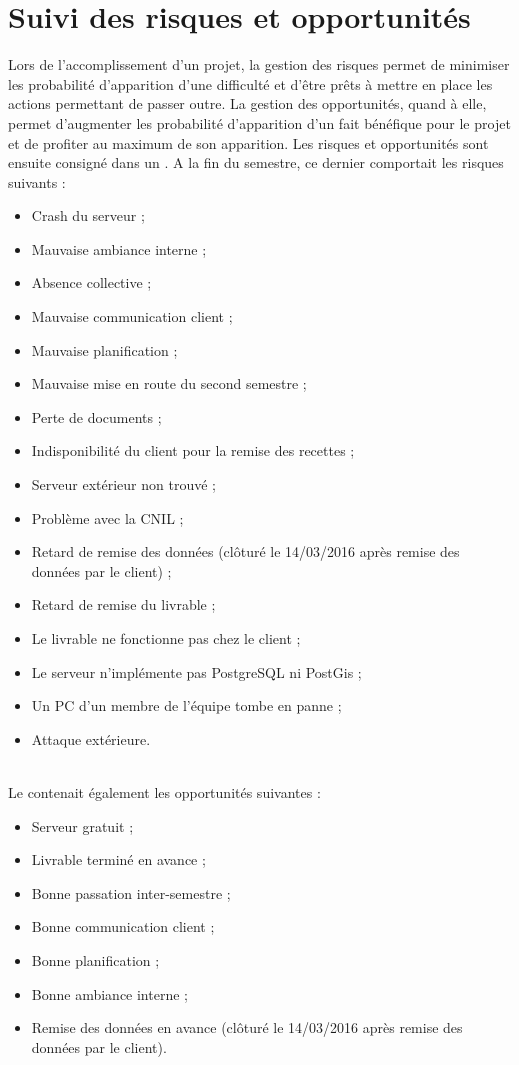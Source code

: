 \documentclass[asi]{picInsa}
\begin{document}
\section{Suivi des risques et opportunités}
Lors de l'accomplissement d'un projet, la gestion des risques permet de minimiser les probabilité d’apparition d'une difficulté et d'être prêts à mettre en place les actions permettant de passer outre. La gestion des opportunités, quand à elle, permet d'augmenter les probabilité d’apparition d'un fait bénéfique pour le projet et de profiter au maximum de son apparition. Les risques et opportunités sont ensuite consigné dans un \PRO{}. A la fin du semestre, ce dernier comportait les risques suivants :
\begin{itemize}
\item Crash du serveur ;
\item Mauvaise ambiance interne ;
\item Absence collective ;
\item Mauvaise communication client ;
\item Mauvaise planification ;
\item Mauvaise mise en route du second semestre ;
\item Perte de documents ;
\item Indisponibilité du client pour la remise des recettes ;
\item Serveur extérieur non trouvé ;
\item Problème avec la CNIL ;
\item Retard de remise des données (clôturé le 14/03/2016 après remise des données par le client) ;
\item Retard de remise du livrable ;
\item Le livrable ne fonctionne pas chez le client ;
\item Le serveur n’implémente pas PostgreSQL ni PostGis ;
\item Un PC d’un membre de l’équipe tombe en panne ;
\item Attaque extérieure.
\end{itemize}
~\\
Le \PRO{} contenait également les opportunités suivantes : 
\begin{itemize}
\item Serveur gratuit ;
\item Livrable terminé en avance ;
\item Bonne passation inter-semestre ;
\item Bonne communication client ;
\item Bonne planification ;
\item Bonne ambiance interne ;
\item Remise des données en avance (clôturé le 14/03/2016 après remise des données par le client).
\end{itemize}
\end{document}
